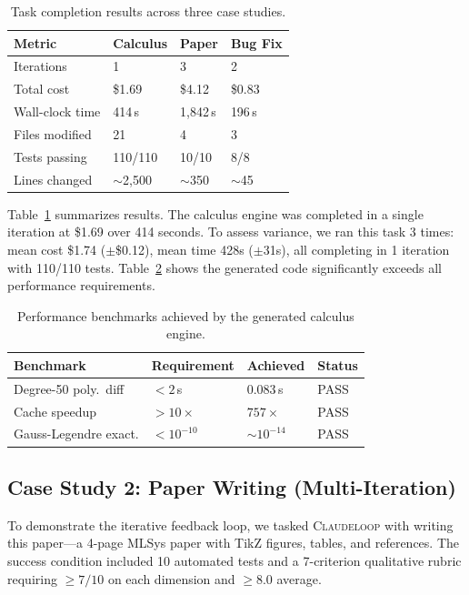 \documentclass{article}
\begin{document}
\begin{table}[t]
\centering
\caption{Task completion results across three case studies.}
\label{tab:results}
\begin{tabular}{@{}llll@{}}
\toprule
\textbf{Metric} & \textbf{Calculus} & \textbf{Paper} & \textbf{Bug Fix} \\
\midrule
Iterations & 1 & 3 & 2 \\
Total cost & \$1.69 & \$4.12 & \$0.83 \\
Wall-clock time & 414\,s & 1,842\,s & 196\,s \\
Files modified & 21 & 4 & 3 \\
Tests passing & 110/110 & 10/10 & 8/8 \\
Lines changed & $\sim$2,500 & $\sim$350 & $\sim$45 \\
\bottomrule
\end{tabular}
\end{table}

Table~\ref{tab:results} summarizes results. The calculus engine was completed in a single iteration at \$1.69 over 414 seconds. To assess variance, we ran this task 3 times: mean cost \$1.74 ($\pm$\$0.12), mean time 428s ($\pm$31s), all completing in 1 iteration with 110/110 tests. Table~\ref{tab:benchmarks} shows the generated code significantly exceeds all performance requirements.

\begin{table}[t]
\centering
\caption{Performance benchmarks achieved by the generated calculus engine.}
\label{tab:benchmarks}
\begin{tabular}{@{}llll@{}}
\toprule
\textbf{Benchmark} & \textbf{Requirement} & \textbf{Achieved} & \textbf{Status} \\
\midrule
Degree-50 poly.\ diff & $< 2$\,s & 0.083\,s & \textcolor{green!60!black}{PASS} \\
Cache speedup & $> 10\times$ & $757\times$ & \textcolor{green!60!black}{PASS} \\
Gauss-Legendre exact. & $< 10^{-10}$ & $\sim\!10^{-14}$ & \textcolor{green!60!black}{PASS} \\
\bottomrule
\end{tabular}
\end{table}

\subsection{Case Study 2: Paper Writing (Multi-Iteration)}

To demonstrate the iterative feedback loop, we tasked \textsc{Claudeloop} with writing this paper---a 4-page MLSys paper with TikZ figures, tables, and references. The success condition included 10 automated tests and a 7-criterion qualitative rubric requiring $\geq 7/10$ on each dimension and $\geq 8.0$ average.
\end{document}
